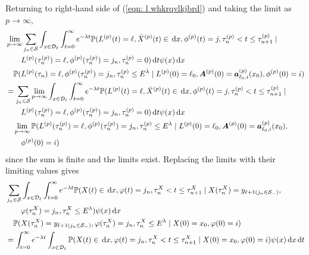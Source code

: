 Returning to right-hand side of (\ref{eqn: l whkrqvlkjbrd}) and taking the limit as \(p\to\infty\), 
\begin{align}
	&\lim_{p\to\infty} \sum_{j_n\in\mathcal S}
	\int_{x\in\mathcal{D}_\ell} \int_{t=0}^\infty e^{-\lambda t} \mathbb P(L^{(p)}(t) = \ell, \bar X^{(p)}(t) \in \, \mathrm{d} x, \phi^{(p)}(t) = j, 
	\tau_n^{(p)}<t \leq \tau_{n+1}^{(p)} \mid \nonumber 
	 \\&\qquad{}L^{(p)}(\tau_n^{(p)}) = \ell, \phi^{(p)}(\tau_n^{(p)}) = j_n, \tau_{n}^{(p)}= 0)\, \mathrm{d} t \psi(x)\, \mathrm{d} x \nonumber
	 \\&\quad \mathbb P(L^{(p)}(\tau_n) = \ell, \phi^{(p)}(\tau_n^{(p)}) = j_n, \tau_{n}^{(p)}\leq E^\lambda 
	 \mid L^{(p)}(0)=\ell_0, \boldsymbol A^{(p)}(0)=\boldsymbol  a_{\ell_0,i}^{(p)}(x_0), \phi^{(p)}(0)=i)\nonumber
	 \\&= \sum_{j_n\in\mathcal S}
	\lim_{p\to\infty} \int_{x\in\mathcal{D}_\ell} \int_{t=0}^\infty e^{-\lambda t}  \mathbb P(L^{(p)}(t) = \ell, \bar X^{(p)}(t) \in \, \mathrm{d} x, \phi^{(p)}(t) = j, 
	\tau_n^{(p)}<t \leq \tau_{n+1}^{(p)} \mid \nonumber 
	 \\&\qquad{}L^{(p)}(\tau_n^{(p)}) = \ell, \phi^{(p)}(\tau_n^{(p)}) = j_n, \tau_{n}^{(p)}= 0)\, \mathrm{d} t \psi(x)\, \mathrm{d} x \nonumber
	 \\&\quad{} \lim_{p\to\infty} \mathbb P(L^{(p)}(\tau_n^{(p)}) = \ell, \phi^{(p)}(\tau_n^{(p)}) = j_n, \tau_{n}^{(p)}\leq E^\lambda 
	 \mid L^{(p)}(0)=\ell_0, \boldsymbol A^{(p)}(0)=\boldsymbol  a_{\ell_0,i}^{(p)}(x_0), \nonumber 
	 \\&\qquad{}\phi^{(p)}(0)=i)\nonumber
\end{align}
since the sum is finite and the limits exist. Replacing the limits with their limiting values gives 
\begin{align}
	 &\sum_{j_n\in\mathcal S}\int_{x\in\mathcal{D}_\ell} \int_{t=0}^\infty e^{-\lambda t} \mathbb P(X(t)\in\, \mathrm{d} x, \varphi(t)=j_n, \tau_n^X < t \leq \tau_{n+1}^X \mid X(\tau_n^X) = y_{\ell+1(j_n\in\mathcal S_-)}, \nonumber 
	\\&\qquad{} \varphi(\tau_n^X)=j_n, \tau_n^X\leq E^\lambda ) \psi(x)\, \mathrm{d} x\nonumber
	\\&\quad{}\mathbb P(X(\tau_n^X) = y_{\ell+1(j_{n}\in\mathcal S_-)}, 
		\varphi(\tau_n^X) = j_n, \tau_{n}^X\leq E^\lambda
		\mid X(0)=x_0, \varphi(0)=i)\nonumber
	\\&= \int_{t=0}^\infty e^{-\lambda t}  \int_{x\in\mathcal{D}_\ell}\mathbb P(X(t)\in\, \mathrm{d} x, \varphi(t)=j_n, \tau_n^X < t \leq \tau_{n+1}^X 
	\mid X(0)=x_0, \varphi(0)=i)\psi(x)\, \mathrm{d} x\, \mathrm{d} t
\end{align}


